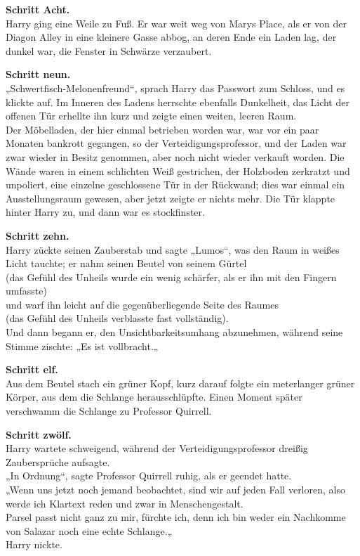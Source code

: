 {\textbf{Schritt Acht.}\\ Harry ging eine Weile zu Fuß. Er war weit weg von Marys Place, als er von der Diagon Alley in eine kleinere Gasse abbog, an deren Ende ein Laden lag, der dunkel war, die Fenster in Schwärze verzaubert.

\textbf{Schritt neun.}\\ „Schwertfisch-Melonenfreund“, sprach Harry das Passwort zum Schloss, und es klickte auf. Im Inneren des Ladens herrschte ebenfalls Dunkelheit, das Licht der offenen Tür erhellte ihn kurz und zeigte einen weiten, leeren Raum.\\ Der Möbelladen, der hier einmal betrieben worden war, war vor ein paar Monaten bankrott gegangen, so der Verteidigungsprofessor, und der Laden war zwar wieder in Besitz genommen, aber noch nicht wieder verkauft worden. Die Wände waren in einem schlichten Weiß gestrichen, der Holzboden zerkratzt und unpoliert, eine einzelne geschlossene Tür in der Rückwand; dies war einmal ein Ausstellungsraum gewesen, aber jetzt zeigte er nichts mehr. Die Tür klappte hinter Harry zu, und dann war es stockfinster.

\textbf{Schritt zehn.}\\ Harry zückte seinen Zauberstab und sagte „Lumos“, was den Raum in weißes Licht tauchte; er nahm seinen Beutel von seinem Gürtel\\ (das Gefühl des Unheils wurde ein wenig schärfer, als er ihn mit den Fingern umfasste)\\ und warf ihn leicht auf die gegenüberliegende Seite des Raumes\\ (das Gefühl des Unheils verblasste fast vollständig).\\ Und dann begann er, den Unsichtbarkeitsumhang abzunehmen, während seine Stimme zischte: „Es ist vollbracht.„

\textbf{Schritt elf.}\\ Aus dem Beutel stach ein grüner Kopf, kurz darauf folgte ein meterlanger grüner Körper, aus dem die Schlange herausschlüpfte. Einen Moment später verschwamm die Schlange zu Professor Quirrell.

\textbf{Schritt zwölf.}\\ Harry wartete schweigend, während der Verteidigungsprofessor dreißig Zaubersprüche aufsagte.\\ „In Ordnung“, sagte Professor Quirrell ruhig, als er geendet hatte.\\ „Wenn uns jetzt noch jemand beobachtet, sind wir auf jeden Fall verloren, also werde ich Klartext reden und zwar in Menschengestalt.\\ Parsel passt nicht ganz zu mir, fürchte ich, denn ich bin weder ein Nachkomme von Salazar noch eine echte Schlange.„\\ Harry nickte.

}
